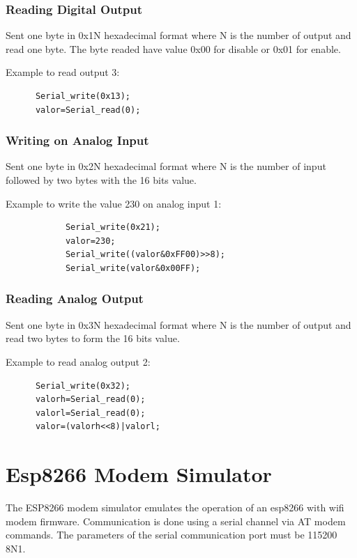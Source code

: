 \subsubsection{Reading Digital Output}
Sent one byte in 0x1N hexadecimal format where N  is the number of output and read one byte. The byte readed have value 0x00 for disable or 0x01 for enable. 

Example to read output 3:
\begin{verbatim}
      Serial_write(0x13);
      valor=Serial_read(0);
\end{verbatim}


\subsubsection{Writing on Analog Input} 
Sent one byte in 0x2N hexadecimal format where N  is the number of input followed by two bytes with the 16 bits value.

Example to write the value 230 on analog input 1:
\begin{verbatim}
            Serial_write(0x21);
            valor=230;
            Serial_write((valor&0xFF00)>>8);
            Serial_write(valor&0x00FF);
\end{verbatim}

\subsubsection{Reading Analog Output}
Sent one byte in 0x3N hexadecimal format where N  is the number of output and read two bytes to form the 16 bits value.

Example to read analog output 2:
\begin{verbatim}
      Serial_write(0x32);
      valorh=Serial_read(0);
      valorl=Serial_read(0);
      valor=(valorh<<8)|valorl;
\end{verbatim}



\section{Esp8266 Modem Simulator} \hypertarget{def:espmsim}{}


The ESP8266 modem simulator emulates the operation of an esp8266
with wifi modem firmware. Communication is done using a serial channel via 
AT modem commands. 
The parameters of the serial communication port must be  115200 8N1. 

